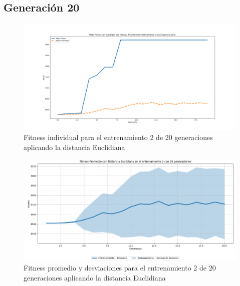 \documentclass[conference]{IEEEtran}
\begin{document}
\subsection{Generación 20}
\setcounter{figure}{0}
\renewcommand{\thefigure}{S\arabic{figure}C-E}


\begin{figure}[H]
    \centering
    \includegraphics[width=0.9 \linewidth]{Euclidiana/Fitness_individual_20/Fitness_2_Eucli_20Gen.png}
    \caption{Fitness individual para el entrenamiento 2 de 20 generaciones aplicando la distancia Euclidiana}
    \label{fig:eucli_2_20}
\end{figure}
\begin{figure}[H]
    \centering
    \includegraphics[width=0.9 \linewidth]{Euclidiana/Fitness_individual_20/Fitness_2_Eucli_20Gen_Sombra.png}
    \caption{Fitness promedio y desviaciones para el entrenamiento 2 de 20 generaciones aplicando la distancia Euclidiana}
    \label{fig:eucli_2_20_sombra}
\end{figure}
\end{document}
